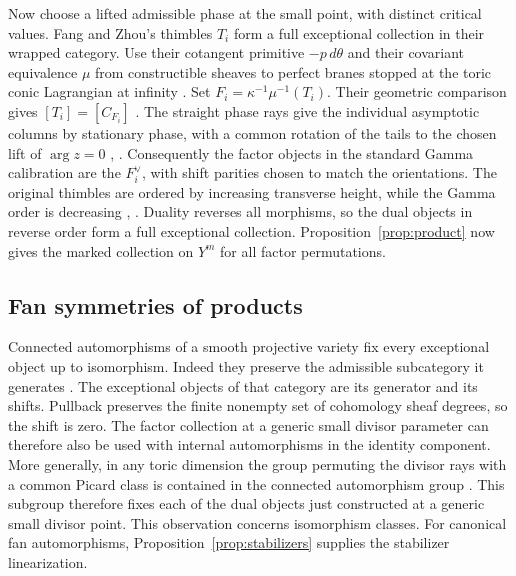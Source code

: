 Now choose a lifted admissible phase at the small point, with distinct critical values. Fang and Zhou's thimbles $T_i$ form a full exceptional collection in their wrapped category. Use their cotangent primitive $-p\,d\theta$ and their covariant equivalence $\mu$ from constructible sheaves to perfect branes stopped at the toric conic Lagrangian at infinity \cite[Theorem~5.1]{FZ}. Set $F_i=\kappa^{-1}\mu^{-1}(T_i)$. Their geometric comparison gives $[T_i]=[C_{F_i}]$ \cite[Proposition~5.4 and Corollary~5.7]{FZ}. The straight phase rays give the individual asymptotic columns by stationary phase, with a common rotation of the tails to the chosen lift of $\arg z=0$ \cite[proof of Theorem~6.4]{GI}, \cite[\S6.2]{FZ}. Consequently the factor objects in the standard Gamma calibration are the $F_i^\vee$, with shift parities chosen to match the orientations. The original thimbles are ordered by increasing transverse height, while the Gamma order is decreasing \cite[Figure~1 and Lemma~5.5]{FZ}, \cite[Remark~2.6.5]{GGI}. Duality reverses all morphisms, so the dual objects in reverse order form a full exceptional collection. Proposition~\ref{prop:product} now gives the marked collection on $Y^m$ for all factor permutations.

\subsection{Fan symmetries of products}

Connected automorphisms of a smooth projective variety fix every exceptional object up to isomorphism. Indeed they preserve the admissible subcategory it generates \cite[Corollary~3.15]{KaO}. The exceptional objects of that category are its generator and its shifts. Pullback preserves the finite nonempty set of cohomology sheaf degrees, so the shift is zero. The factor collection at a generic small divisor parameter can therefore also be used with internal automorphisms in the identity component. More generally, in any toric dimension the group permuting the divisor rays with a common Picard class is contained in the connected automorphism group \cite[Theorem~4.5]{Dun}. This subgroup therefore fixes each of the dual objects just constructed at a generic small divisor point. This observation concerns isomorphism classes. For canonical fan automorphisms, Proposition~\ref{prop:stabilizers} supplies the stabilizer linearization.

